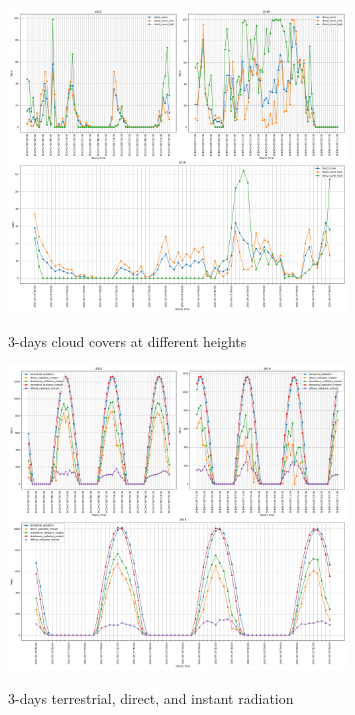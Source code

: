 \begin{figure}[h]
	\centering
	\caption{3-days cloud covers at different heights }
	\includegraphics[width=0.8\textwidth]{graphs/weather_variables/3_cloud_cover_cloud_cover_mid_cloud_cover_high.png}
	\label{fig:cloud_covers_3days}
\end{figure}

\begin{figure}[h]
	\centering
	\caption{3-days terrestrial, direct, and instant radiation}
	\includegraphics[width=0.8\textwidth]{graphs/weather_variables/3_terrestrial_radiation_direct_radiation_instant_shortwave_radiation_instant.png}
	\label{fig:radi_3days}
\end{figure}

